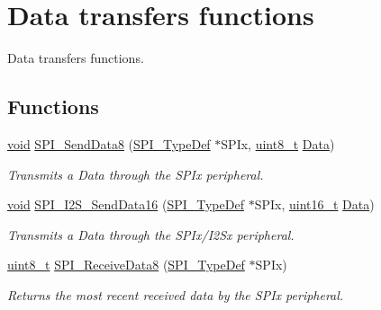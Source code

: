 \hypertarget{group___s_p_i___group2}{\section{Data transfers functions}
\label{group___s_p_i___group2}
}


Data transfers functions.  


\subsection*{Functions}
\begin{DoxyCompactItemize}
\item 
\hyperlink{group___n_a_m_e_ga18028b8badbf1ea7e704ccac3c488e82}{void} \hyperlink{group___s_p_i___group2_gabacb635cd2b8d14ededffb9d51ed3491}{S\-P\-I\-\_\-\-Send\-Data8} (\hyperlink{struct_s_p_i___type_def}{S\-P\-I\-\_\-\-Type\-Def} $\ast$S\-P\-Ix, \hyperlink{stdint_8h_aba7bc1797add20fe3efdf37ced1182c5}{uint8\-\_\-t} \hyperlink{group___copter_control_b_l_ga6f3335509cc4943e20df66f72483910c}{Data})
\begin{DoxyCompactList}\small\item\em Transmits a Data through the S\-P\-Ix peripheral. \end{DoxyCompactList}\item 
\hyperlink{group___n_a_m_e_ga18028b8badbf1ea7e704ccac3c488e82}{void} \hyperlink{group___s_p_i___group2_gad4592b2e3e64e7ebd73e960da8d7af24}{S\-P\-I\-\_\-\-I2\-S\-\_\-\-Send\-Data16} (\hyperlink{struct_s_p_i___type_def}{S\-P\-I\-\_\-\-Type\-Def} $\ast$S\-P\-Ix, \hyperlink{stdint_8h_a273cf69d639a59973b6019625df33e30}{uint16\-\_\-t} \hyperlink{group___copter_control_b_l_ga6f3335509cc4943e20df66f72483910c}{Data})
\begin{DoxyCompactList}\small\item\em Transmits a Data through the S\-P\-Ix/\-I2\-Sx peripheral. \end{DoxyCompactList}\item 
\hyperlink{stdint_8h_aba7bc1797add20fe3efdf37ced1182c5}{uint8\-\_\-t} \hyperlink{group___s_p_i___group2_gaf3b5692873d59d51e704818d17dda368}{S\-P\-I\-\_\-\-Receive\-Data8} (\hyperlink{struct_s_p_i___type_def}{S\-P\-I\-\_\-\-Type\-Def} $\ast$S\-P\-Ix)
\begin{DoxyCompactList}\small\item\em Returns the most recent received data by the S\-P\-Ix peripheral. \end{DoxyCompactList}\item 

\end{DoxyCompactItemize}
